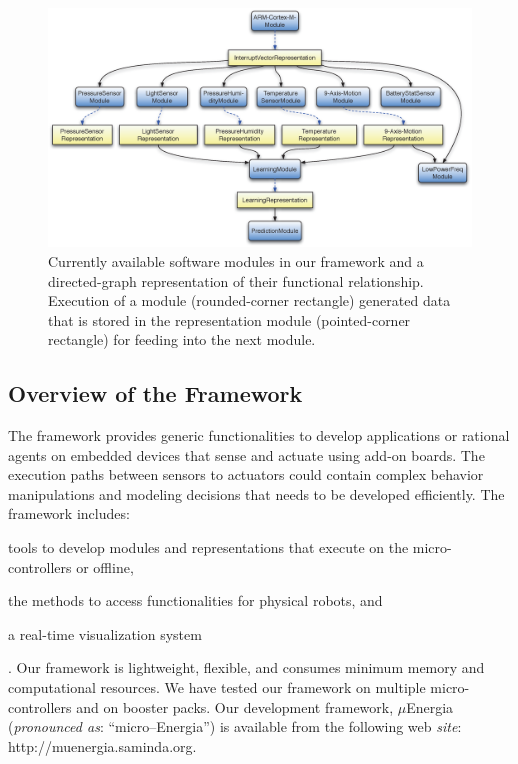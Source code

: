 \documentclass[]{IEEEtran}
\begin{document}
\begin{figure}[!t]
\centering
\includegraphics[width=.75\textwidth]{figures/graph_structure_def-crop3.eps}
\caption{Currently available software modules in our framework and a directed-graph representation of their functional relationship. Execution of a module (rounded-corner rectangle) generated data that is stored in the representation module (pointed-corner rectangle) for feeding into the next module.}
 \label{fig:framework}
\end{figure}

\subsection{Overview of the Framework}
\label{sec:OverviewOfTheFramework}

\par
The framework provides generic functionalities to develop applications or
rational agents on embedded devices that sense and actuate using add-on boards.
The execution paths between sensors to actuators could contain complex behavior
manipulations and modeling decisions that needs to be developed efficiently.
The framework includes: \begin{inparaenum}[($i$)] \item tools to develop
modules and representations that execute on the micro-controllers or offline,
\item the methods to access functionalities for physical robots, and \item a
real-time visualization system\end{inparaenum}. Our framework is lightweight,
flexible, and consumes minimum memory and computational resources. We have
tested our framework on multiple micro-controllers and on booster packs.  Our
development framework, $\mu$Energia (\textit{pronounced as}:
``micro--Energia'') is available from the following web \textit{site}:
{http://muenergia.saminda.org}.
\end{document}
